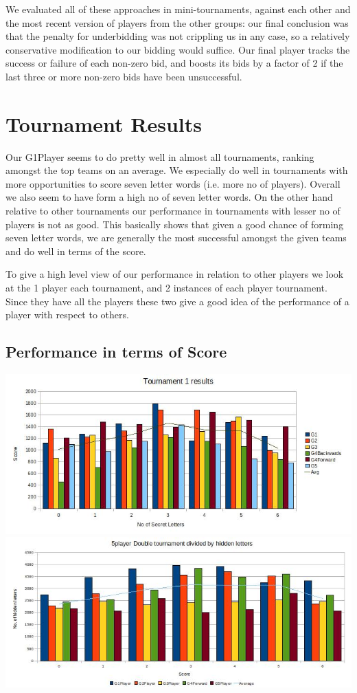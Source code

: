\documentclass[11pt]{article}
\begin{document}
We evaluated all of these approaches in mini-tournaments, against each other and the most recent version of players from the other groups: our final conclusion was that the penalty for underbidding was not crippling us in any case, so a relatively conservative modification to our bidding would suffice.  Our final player tracks the success or failure of each non-zero bid, and boosts its bids by a factor of 2 if the last three or more non-zero bids have been unsuccessful. %



\section{Tournament Results} %
	Our G1Player seems to do pretty well in almost all tournaments, ranking amongst the top teams on an average. We especially do well in tournaments with more opportunities to score seven letter words (i.e. more no of players). Overall we also seem to have form a high no of seven letter words. On the other hand relative to other tournaments our performance in tournaments with lesser no of players is not as good. This basically shows that given a good chance of forming seven letter words, we are generally the most successful amongst the given teams and do well in terms of the score.
	
	To give a high level view of our performance in relation to other players we look at the 1 player each tournament, and 2 instances of each player tournament. Since they have all the players these two give a good idea of the performance of a player with respect to others. 
	
	\subsection{Performance in terms of Score}
	
	\includegraphics[width=1\textwidth]{T1Results}
	\includegraphics[width=1\textwidth]{T2Results}
	
\end{document}
